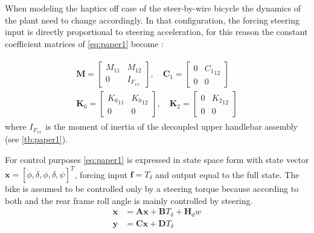 When modeling the haptics off case of the steer-by-wire bicycle the dynamics of the plant need to change accordingly. In that configuration, the forcing steering input is directly proportional to steering acceleration, for this reason the  constant coefficient matrices of \ref{eq:paper1} become :

\begin{align}
\begin{array}{l}{\mathbf{M}=\left[\begin{array}{cc}{{M}_{11}} & {{M}_{12}} \\ {0} & {I_{F_{xx}}}\end{array}\right], \quad \mathbf{C}_{1}=\left[\begin{array}{cc}{0} & {{C_1}_{\scriptscriptstyle 12}} \\ {0} & {0}\end{array}\right]} \\ {\mathbf{K}_{0}=\left[\begin{array}{cc}{{K_0}_{\scriptscriptstyle 11}} & {{K_0}_{\scriptscriptstyle 12}}  \\ {0} & {0}\end{array}\right], \quad \mathbf{K}_{2}=\left[\begin{array}{ccc}{0} & {{K_2}_{\scriptscriptstyle 12}} \\  {0} & {0}\end{array}\right]}\end{array}
\end{align}
where \ensuremath{I_{F_{xx}}} is the moment of inertia of the  decoupled upper handlebar assembly (see \cref{tb:paper1}).
 
For control purposes \cref{eq:paper1} is expressed in state space form with state vector \ensuremath{\mathbf{x}=[\dot{\phi}, \dot{\delta}, \phi, \delta, \psi]^{T}}, forcing input \ensuremath{\mathbf{f}=T_{\delta}} and output equal to the full state. The  bike is assumed to be controlled only by a steering torque because according to both \citet{moore2012human} and \citet{weir1973manual}  the rear frame roll angle is mainly
 controlled by steering. 
 \begin{align}
    \dot{\mathbf{x}} &=\mathbf{A} \mathbf{x}+\mathbf{B} T_\delta + \mathbf{H}_d w
     \label{eq:bikeEOM1}\\
    \mathbf{y}&=\mathbf{C} \mathbf{x}+\mathbf{D} T_\delta
    \label{eq:bikeEOM2}
\end{align}

